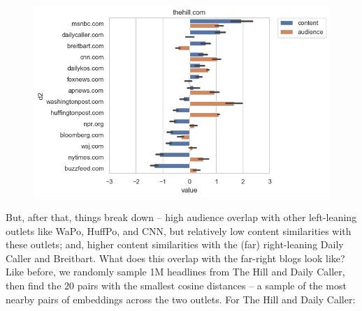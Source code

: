 \documentclass{scrartcl}
\begin{document}
\begin{figure}[H]
  \centering
  \includegraphics[width=\textwidth]{figures/ca-thehill-composite.png}
\end{figure}

But, after that, things break down -- high audience overlap with other left-leaning outlets like WaPo, HuffPo, and CNN, but relatively low content similarities with these outlets; and, higher content similarities with the (far) right-leaning Daily Caller and Breitbart. What does this overlap with the far-right blogs look like? Like before, we randomly sample 1M headlines from The Hill and Daily Caller, then find the 20 pairs with the smallest cosine distances -- a sample of the most nearby pairs of embeddings across the two outlets. For The Hill and Daily Caller:
\end{document}

